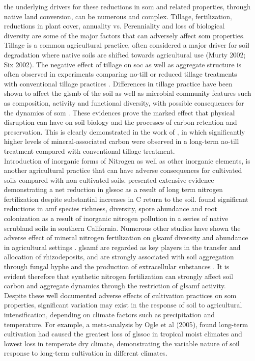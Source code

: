 		the underlying drivers for these reductions in \gls{som} and related properties, through native land conversion, can be numerous and complex. Tillage, fertilization, reductions in plant cover, annuality vs. Perenniality and loss of biological diversity are some of the major factors that can adversely affect \gls{som} properties.
		Tillage is a common agricultural practice, often considered a major driver for soil degradation where native soils are shifted towards agricultural use (Murty 2002; Six 2002). The negative effect of tillage on \gls{soc} as well as aggregate structure is often observed in experiments comparing no-till or reduced tillage treatments with conventional tillage practices \citep{six1998, west2002}.
		Differences in tillage practice have  been shown to affect the gls{mb} of the soil \citep{jat2020, alvaro-fuentes2009, sun2011} as well as
		microbial community features such as composition, activity and functional diversity, with possible consequences for the dynamics of \gls{som} \citep{vangroenigen2010, govaerts2007}. These evidences prove the marked effect that physical disruption can have on soil biology and the processes of carbon retention and preservation. This is clearly demonstrated in the work of \citet{plaza2013}, in which significantly higher levels of mineral-associated carbon were observed in a long-term no-till treatment compared with conventional tillage treatment.\\
		Introduction of inorganic forms of Nitrogen as well as other inorganic elements, is another agricultural practice that can have adverse consequences for cultivated soils compared with non-cultivated soils.  \citet{khan2007}   presented extensive evidence demonstrating a net reduction in gls{soc} as a result of long term nitrogen fertilization despite substantial increases in C return to the soil. \citet{egerton-warburton2000} found significant reductions in \gls{amf}  species richness, diversity, spore abundance and root colonization as a result of inorganic nitrogen pollution in a series of native scrubland soils in southern California. Numerous other studies have shown the adverse effect of mineral nitrogen fertilization on gls{amf} diversity and abundance in agricultural settings \citep{bradley2006,treseder2004,zhang2019,corkidi2002}.  gls{amf} are regarded as key players in the transfer and allocation of rhizodeposits, and are strongly associated with soil aggregation through fungal hyphe and the production of extracellular substances \citep{rillig2006,leifheit2014,rillig2002}. It is evident therefore that synthetic nitrogen fertilization can strongly affect soil carbon and aggregate dynamics through the restriction of gls{amf} activity.\\
		Despite these well documented adverse effects of cultivation practices on \gls{som} properties, significant variation may exist in the response of soil to agricultural intensification, depending on climate factors such as precipitation and temperature. For example, a meta-analysis by Ogle et al (2005), found long-term cultivation had caused the greatest loss of gls{soc} in tropical moist climates and lowest loss in temperate dry climate, demonstrating the variable nature of soil response to long-term cultivation in different climates.\\

